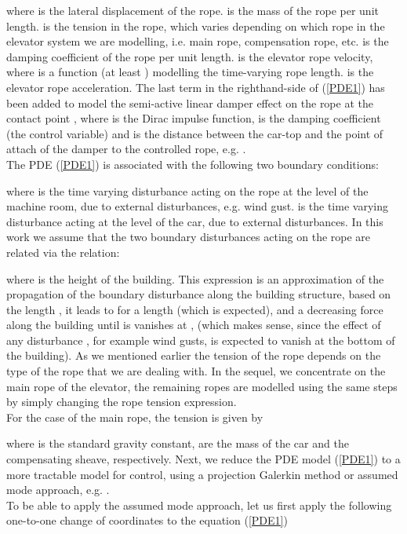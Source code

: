 \documentclass[letterpaper, 11 pt, conference]{ieeeconf}
\begin{document}
where  is the lateral displacement of the rope.  is
the mass of the rope per unit length.  is the tension in the
rope, which varies depending on which rope in the elevator system
we are modelling, i.e. main rope, compensation rope, etc. 
is the damping coefficient of the rope per unit length.
 is the elevator rope
velocity, where  is a
function (at least  ) modelling the time-varying rope
length.  is the elevator
rope acceleration. The last term in the righthand-side of
(\ref{PDE1}) has been added to model the semi-active linear damper
effect on the rope at the contact point ,
where  is the Dirac impulse function,  is the
damping coefficient (the control variable) and  is the
distance between the car-top and the
point of attach of the damper to the controlled rope, e.g. \cite{ZC06}.\\
The PDE (\ref{PDE1}) is associated with the following two boundary
conditions:

where  is the time varying disturbance acting on the rope
at the level of the machine room, due to external disturbances,
e.g. wind gust.  is the time varying disturbance acting at
the level of the car, due to external disturbances. In this work
we assume that the two boundary disturbances acting on the rope
are related via the relation:

where  is the height of the building. This expression is an
approximation of the propagation of the boundary disturbance
 along the building structure, based on the length , it
leads to  for a length  (which is expected), and a
decreasing force along the building until is vanishes at ,
 (which makes sense, since the effect of any disturbance
, for example wind gusts, is expected to vanish at the
bottom of the building). As we mentioned earlier the tension of
the rope  depends on the type of the rope that we are
dealing with. In the sequel, we concentrate on the main rope of
the elevator, the remaining ropes are modelled using the same
steps by simply changing the rope
tension expression.\\
For the case of the main rope, the tension is given by

where  is the standard gravity constant,  are the
mass of the car and the compensating sheave, respectively.
Next, we reduce the PDE model (\ref{PDE1}) to a more tractable
model for control, using a projection Galerkin method or assumed
mode approach, e.g. \cite{M67,HLB96}.\\To be able to apply the
assumed mode approach, let us first apply the following one-to-one
change of coordinates to the equation (\ref{PDE1})
\end{document}
